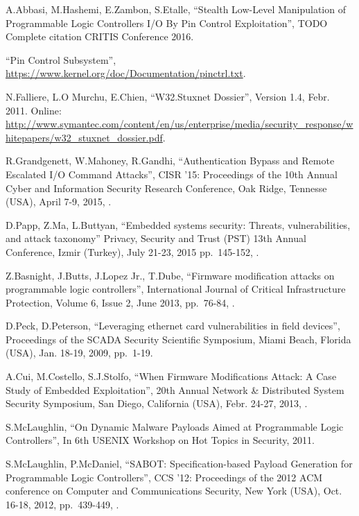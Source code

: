 \begin{thebibliography}{99}

A.Abbasi, M.Hashemi, E.Zambon, S.Etalle,
``Stealth Low-Level Manipulation of Programmable Logic Controllers I/O By Pin Control Exploitation'',
TODO Complete citation CRITIS Conference 2016.

``Pin Control Subsystem'',
\url{https://www.kernel.org/doc/Documentation/pinctrl.txt}.

N.Falliere, L.O Murchu, E.Chien,
``W32.Stuxnet  Dossier'',
Version 1.4, Febr. 2011.
Online: \url{http://www.symantec.com/content/en/us/enterprise/media/security_response/whitepapers/w32_stuxnet_dossier.pdf}.

R.Grandgenett, W.Mahoney, R.Gandhi,
``Authentication Bypass and Remote Escalated I/O Command Attacks'',
CISR '15: Proceedings of the 10th Annual Cyber and Information Security Research Conference,
Oak Ridge, Tennesse (USA), April 7-9, 2015,
.

D.Papp, Z.Ma, L.Buttyan,
``Embedded systems security: Threats, vulnerabilities, and attack taxonomy''
Privacy, Security and Trust (PST) 13th Annual Conference,
Izmir (Turkey), July 21-23, 2015
pp.\ 145-152,
.

Z.Basnight, J.Butts, J.Lopez Jr., T.Dube,
``Firmware modification attacks on programmable logic controllers'',
International Journal of Critical Infrastructure Protection,
Volume 6, Issue 2, June 2013,
pp.\ 76-84,
.

D.Peck, D.Peterson,
``Leveraging ethernet card vulnerabilities in field devices'',
Proceedings of the SCADA Security Scientific Symposium,
Miami Beach, Florida (USA), Jan. 18-19, 2009,
pp.\ 1-19.

A.Cui, M.Costello, S.J.Stolfo,
``When Firmware Modifications Attack: A Case Study of Embedded Exploitation'',
20th Annual Network \& Distributed System Security Symposium,
San Diego, California (USA), Febr. 24-27, 2013,
.

S.McLaughlin,
``On Dynamic Malware Payloads Aimed at Programmable Logic Controllers'',
In 6th USENIX Workshop on Hot Topics in Security,
2011.

S.McLaughlin, P.McDaniel,
``SABOT: Specification-based Payload Generation for Programmable Logic Controllers'',
CCS '12: Proceedings of the 2012 ACM conference on Computer and Communications Security,
New York (USA), Oct. 16-18, 2012,
pp.\ 439-449,
.


\end{thebibliography}
